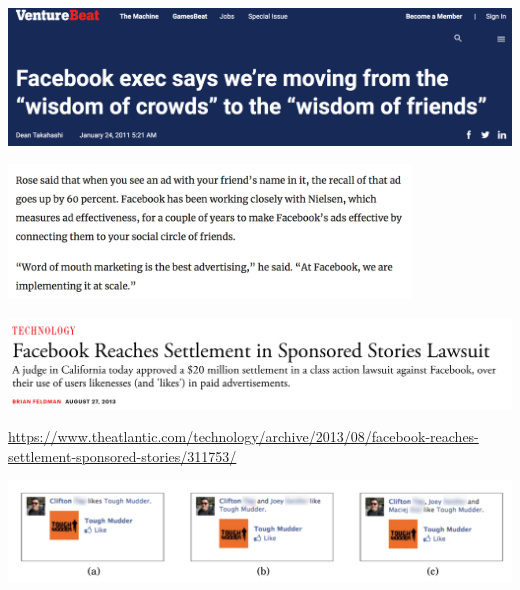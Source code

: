 \documentclass[aspectratio=169]{beamer}
\begin{document}
\begin{frame}

\begin{center}
\includegraphics[width=\textwidth]{figures/takahashi_facebook_2011_title}
\end{center}

\vfill
\begin{center}
\includegraphics[width=0.8\textwidth]{figures/takahashi_facebook_2011_pullquote}
\end{center}

\end{frame}
\begin{frame}

\begin{center}
\includegraphics[width=\textwidth]{figures/feldman_facebook_2013_headline}
\end{center}

\vfill
\url{https://www.theatlantic.com/technology/archive/2013/08/facebook-reaches-settlement-sponsored-stories/311753/}
\end{frame}
\begin{frame}

\begin{center}
\includegraphics[width=\textwidth]{figures/bakshy_social_2012_fig2}
\end{center}

\end{frame}
\end{document}
